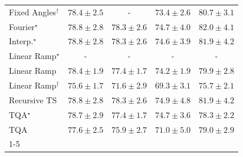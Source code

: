 \begin{tabular}{l|cccc|}
Fixed Angles$^\dagger$ & {\cellcolor[HTML]{056BA7}} \color[HTML]{F1F1F1} $78.4\pm 2.5$ & {\cellcolor[HTML]{000000}} \color[HTML]{F1F1F1} {\cellcolor{white}} \color{black} - & {\cellcolor[HTML]{80AED2}} \color[HTML]{F1F1F1} $73.4\pm 2.6$ & {\cellcolor[HTML]{034D79}} \color[HTML]{F1F1F1} $80.7\pm 3.1$ \\
Fourier$^\star$ & {\cellcolor[HTML]{0567A1}} \color[HTML]{F1F1F1} $78.8\pm 2.8$ & {\cellcolor[HTML]{056CAA}} \color[HTML]{F1F1F1} $78.3\pm 2.6$ & {\cellcolor[HTML]{5C9FC9}} \color[HTML]{F1F1F1} $74.7\pm 4.0$ & {\cellcolor[HTML]{023858}} \color[HTML]{F1F1F1} $82.0\pm 4.1$ \\
Interp.$^\star$ & {\cellcolor[HTML]{0567A1}} \color[HTML]{F1F1F1} $78.8\pm 2.8$ & {\cellcolor[HTML]{056CAA}} \color[HTML]{F1F1F1} $78.3\pm 2.6$ & {\cellcolor[HTML]{5EA0CA}} \color[HTML]{F1F1F1} $74.6\pm 3.9$ & {\cellcolor[HTML]{02395A}} \color[HTML]{F1F1F1} $81.9\pm 4.2$ \\
Linear Ramp$^\star$ & {\cellcolor[HTML]{000000}} \color[HTML]{F1F1F1} {\cellcolor{white}} \color{black} - & {\cellcolor[HTML]{000000}} \color[HTML]{F1F1F1} {\cellcolor{white}} \color{black} - & {\cellcolor[HTML]{000000}} \color[HTML]{F1F1F1} {\cellcolor{white}} \color{black} - & {\cellcolor[HTML]{000000}} \color[HTML]{F1F1F1} {\cellcolor{white}} \color{black} - \\
Linear Ramp & {\cellcolor[HTML]{056BA7}} \color[HTML]{F1F1F1} $78.4\pm 1.9$ & {\cellcolor[HTML]{1278B4}} \color[HTML]{F1F1F1} $77.4\pm 1.7$ & {\cellcolor[HTML]{6BA5CD}} \color[HTML]{F1F1F1} $74.2\pm 1.9$ & {\cellcolor[HTML]{045B8E}} \color[HTML]{F1F1F1} $79.9\pm 2.8$ \\
Linear Ramp$^\dagger$ & {\cellcolor[HTML]{4094C3}} \color[HTML]{F1F1F1} $75.6\pm 1.7$ & {\cellcolor[HTML]{ACC0DD}} \color[HTML]{000000} $71.6\pm 2.9$ & {\cellcolor[HTML]{D8D7E9}} \color[HTML]{000000} $69.3\pm 3.1$ & {\cellcolor[HTML]{3D93C2}} \color[HTML]{F1F1F1} $75.7\pm 2.1$ \\
Recursive TS & {\cellcolor[HTML]{0567A1}} \color[HTML]{F1F1F1} $78.8\pm 2.8$ & {\cellcolor[HTML]{056CAA}} \color[HTML]{F1F1F1} $78.3\pm 2.6$ & {\cellcolor[HTML]{569DC8}} \color[HTML]{F1F1F1} $74.9\pm 4.8$ & {\cellcolor[HTML]{02395A}} \color[HTML]{F1F1F1} $81.9\pm 4.2$ \\
TQA$^\star$ & {\cellcolor[HTML]{0568A3}} \color[HTML]{F1F1F1} $78.7\pm 2.9$ & {\cellcolor[HTML]{1278B4}} \color[HTML]{F1F1F1} $77.4\pm 1.7$ & {\cellcolor[HTML]{5C9FC9}} \color[HTML]{F1F1F1} $74.7\pm 3.6$ & {\cellcolor[HTML]{056CAA}} \color[HTML]{F1F1F1} $78.3\pm 2.2$ \\
TQA & {\cellcolor[HTML]{0D75B3}} \color[HTML]{F1F1F1} $77.6\pm 2.5$ & {\cellcolor[HTML]{3790C0}} \color[HTML]{F1F1F1} $75.9\pm 2.7$ & {\cellcolor[HTML]{B8C6E0}} \color[HTML]{000000} $71.0\pm 5.0$ & {\cellcolor[HTML]{04649E}} \color[HTML]{F1F1F1} $79.0\pm 2.9$ \\
\cline{1-5}
\bottomrule
\end{tabular}
